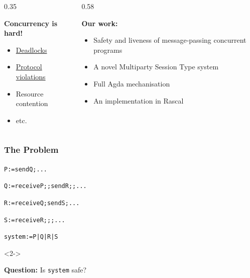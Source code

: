 \documentclass{ltx-talk}
\begin{document}
\begin{frame}
    \begin{columns}
    \begin{column}{0.35\textwidth}
    \begin{sticky}
    \textbf{Concurrency is hard!}
    \begin{itemize}
    \item \underline{Deadlocks}
    \item \underline{Protocol violations}
    \item Resource contention
    \item etc.
    \end{itemize}
    \end{sticky}
    \end{column}
    \hspace{1cm}

    \begin{column}{0.58\textwidth}
    \begin{sticky}
    \textbf{Our work:}
    \begin{itemize}
    \item Safety and liveness of message-passing concurrent programs
    \item A novel Multiparty Session Type system
    \item Full Agda mechanisation
    \item An implementation in Rascal 
    \end{itemize}
    \end{sticky}
    \end{column}
\end{columns}
\end{frame}

\begin{frame}
    \frametitle{The Problem}
    \LARGE

    \begin{alltt}
    P := send Q; ... 

    Q := receive P; ; send R; ; ... 
    
    R := receive Q; send S; ... 
    
    S := receive R;  ; ; ...
    
    system := P | Q | R | S 
    \end{alltt}
    \begin{uncoverenv}<2->
        \begin{center}
        {\textbf{Question:} Is \texttt{system} safe?} 
        \end{center}
    \end{uncoverenv}
\end{frame}
\end{document}
